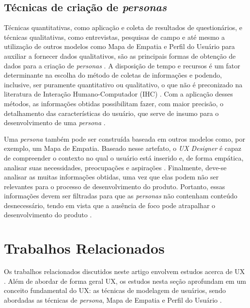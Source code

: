\documentclass[12pt]{article}
\begin{document}
\subsection{Técnicas de criação de \emph{personas}}
Técnicas quantitativas, como aplicação e coleta de resultados de questionários, e técnicas qualitativas, como entrevistas, pesquisas de campo e até mesmo a utilização de outros modelos como Mapa de Empatia e Perfil do Usuário para auxiliar a fornecer dados qualitativos, são as principais formas de obtenção de dados para a criação de \emph{personas} \cite{5928355}. A disposição de tempo e recursos é um fator determinante na escolha do método de coletas de informações e podendo, inclusive, ser puramente quantitativo ou qualitativo, o que não é preconizado na literatura de Interação Humano-Computador (IHC) \cite{10.1145/997078.997089} \cite{10.1007/978-3-642-03658-3_56}. Com a aplicação desses métodos, as informações obtidas possibilitam fazer, com maior precisão, o detalhamento das características do usuário, que serve de insumo para o desenvolvimento de uma \emph{persona} \cite{7328012}.

\par Uma \emph{persona} também pode ser construída baseada em outros modelos como, por exemplo, um Mapa de Empatia. Baseado nesse artefato, o \emph{UX Designer} é capaz de compreender o contexto no qual o usuário está inserido e, de forma empática, analisar suas necessidades, preocupações e aspirações \cite{7328012}. Finalmente, deve-se analisar as muitas informações obtidas, uma vez que elas podem não ser relevantes para o processo de desenvolvimento do produto. Portanto, essas informações devem ser filtradas para que as \emph{personas} não contenham conteúdo desnecessário, tendo em vista que a ausência de foco pode atrapalhar o desenvolvimento do produto \cite{7328012}.

\section{Trabalhos Relacionados} \label{sec:trabalhosrelacionados}
Os trabalhos relacionados discutidos neste artigo envolvem estudos acerca de UX \cite{10.1145/3357155.3358444}. Além de abordar de forma geral UX, os estudos nesta seção aprofundam em um conceito fundamental do UX: as técnicas de modelagem de usuários, sendo abordadas as técnicas de \emph{persona}, Mapa de Empatia e Perfil do Usuário \cite{long_study} \cite{7328012} \cite{10.1145/3313831.3376502} \cite{10.1007/978-3-642-03658-3_56}.
\end{document}
